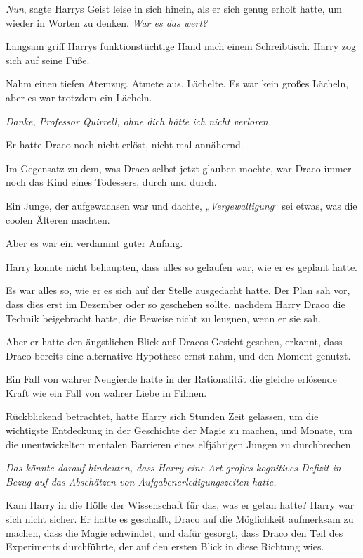{\emph{Nun}, sagte Harrys Geist leise in sich hinein, als er sich genug erholt hatte, um wieder in Worten zu denken. \emph{War es das wert?}

Langsam griff Harrys funktionstüchtige Hand nach einem Schreibtisch. Harry zog sich auf seine Füße.

Nahm einen tiefen Atemzug. Atmete aus. Lächelte. Es war kein großes Lächeln, aber es war trotzdem ein Lächeln.

\emph{Danke, Professor Quirrell, ohne dich hätte ich nicht verloren.}

Er hatte Draco noch nicht erlöst, nicht mal annähernd.

Im Gegensatz zu dem, was Draco selbst jetzt glauben mochte, war Draco immer noch das Kind eines Todessers, durch und durch.

Ein Junge, der aufgewachsen war und dachte, „\emph{Vergewaltigung}“ sei etwas, was die coolen Älteren machten.

Aber es war ein verdammt guter Anfang.

Harry konnte nicht behaupten, dass alles so gelaufen war, wie er es geplant hatte.

Es war alles so, wie er es sich auf der Stelle ausgedacht hatte. Der Plan sah vor, dass dies erst im Dezember oder so geschehen sollte, nachdem Harry Draco die Technik beigebracht hatte, die Beweise nicht zu leugnen, wenn er sie sah.

Aber er hatte den ängstlichen Blick auf Dracos Gesicht gesehen, erkannt, dass Draco bereits eine alternative Hypothese ernst nahm, und den Moment genutzt.

Ein Fall von wahrer Neugierde hatte in der Rationalität die gleiche erlösende Kraft wie ein Fall von wahrer Liebe in Filmen.

Rückblickend betrachtet, hatte Harry sich Stunden Zeit gelassen, um die wichtigste Entdeckung in der Geschichte der Magie zu machen, und Monate, um die unentwickelten mentalen Barrieren eines elfjährigen Jungen zu durchbrechen.

\emph{Das könnte darauf hindeuten, dass Harry eine Art großes kognitives Defizit in Bezug} \emph{auf das Abschätzen von Aufgabenerledigungszeiten hatte.}

Kam Harry in die Hölle der Wissenschaft für das, was er getan hatte? Harry war sich nicht sicher. Er hatte es geschafft, Draco auf die Möglichkeit aufmerksam zu machen, dass die Magie schwindet, und dafür gesorgt, dass Draco den Teil des Experiments durchführte, der auf den ersten Blick in diese Richtung wies.

}
